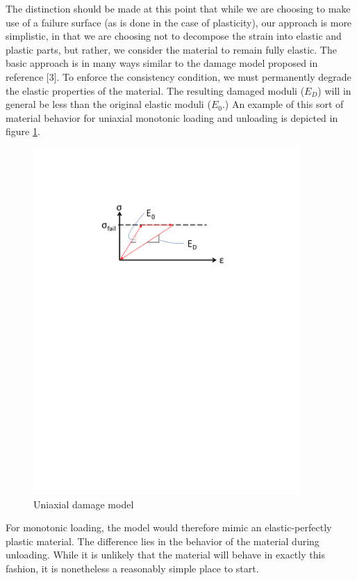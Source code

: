 \documentclass[11pt]{article} %
\begin{document}
The distinction should be made at this point that while we are choosing to make use of a failure surface (as is done in the case of plasticity), our approach is more simplistic, in that we are choosing not to decompose the strain into elastic and plastic parts, but rather, we consider the material to remain fully elastic. The basic approach is in many ways similar to the damage model proposed in reference [3]. To enforce the consistency condition, we must permanently degrade the elastic properties of the material. The resulting damaged moduli ($E_D$) will in general be less than the original elastic moduli ($E_0$.) An example of this sort of material behavior for uniaxial monotonic loading and unloading is depicted in figure \ref{fig:uniaxialdamage}.
\begin{figure} [!ht]
	\centering
	\includegraphics[width = 4.0in,trim=150 530 170 130,clip=true]{uniaxialdamage.pdf}
	\caption{Uniaxial damage model}
	\label{fig:uniaxialdamage}
\end{figure}

For monotonic loading, the model would therefore mimic an elastic-perfectly plastic material. The difference lies in the behavior of the material during unloading. While it is unlikely that the material will behave in exactly this fashion, it is nonetheless a reasonably simple place to start.
\end{document}
